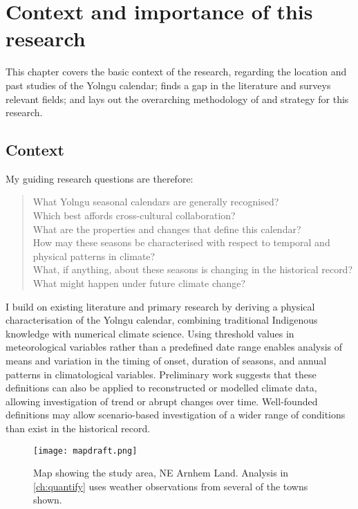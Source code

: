 \chapter{Context and importance of this research}
This chapter covers the basic context of the research, regarding the location and past studies of the Yolngu calendar;
finds a gap in the literature and surveys relevant fields;
and lays out the overarching methodology of and strategy for this research.


\section{Context}

My guiding research questions are therefore:
\blockquote{
What Yolngu seasonal calendars are generally recognised?\\
Which best affords cross-cultural collaboration?\\
What are the properties and changes that define this calendar?\\
How may these seasons be characterised with respect to temporal and physical patterns in climate?\\
What, if anything, about these seasons is changing in the historical record?\\
What might happen under future climate change?\\
}

I build on existing literature and primary research by deriving a physical characterisation of the Yolngu calendar,
combining traditional Indigenous knowledge with numerical climate science.
Using threshold values in meteorological variables rather than a predefined date range enables
analysis of means and variation in the timing of onset, duration of seasons, and annual patterns in climatological variables.
Preliminary work suggests that these definitions can also be applied to reconstructed or modelled climate data,
allowing investigation of trend or abrupt changes over time.
Well-founded definitions may allow scenario-based investigation of a wider range of conditions than exist in the historical record.

\begin{figure}[h]
    \centering
    \texttt{[image: mapdraft.png]}
    \caption[Map showing the study area, NE Arnhem Land]{
        Map showing the study area, NE Arnhem Land.
        Analysis in \autoref{ch:quantify} uses weather observations from several of the towns shown.
        }
    \label{fig:arnhem-map}
\end{figure}

